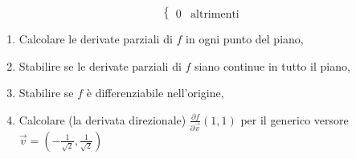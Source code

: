 \begin{example}
\begin{enumerate}
\begin{equation*}
\begin{cases}
				0 &\text{altrimenti}
			\end{cases}
		\end{equation*}
		\begin{enumerate}
			\item Calcolare le derivate parziali di $f$ in ogni punto del piano,
			\item Stabilire se le derivate parziali di $f$ siano continue in tutto il piano,
			\item Stabilire se $f$ è differenziabile nell'origine,
			\item  Calcolare (la derivata direzionale) $\frac{\partial f}{\partial\vec v}(1,1)$ per il generico versore $\vec v=\left(-\frac{1}{\sqrt 2}, \frac{1}{\sqrt 2}\right)$ 
		\end{enumerate}
		
	\end{enumerate}

\end{example}
